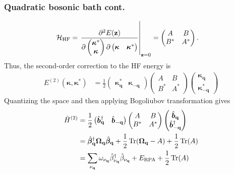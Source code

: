 \begin{frame}
    \frametitle{Quadratic bosonic bath cont.}
\begin{align}
    \mathcal H_{\rm HF}
    =
    \left.
    \frac{\partial^2 E(\mathbf z)}
    {\partial
    \begin{pmatrix}
        \boldsymbol{\kappa}^{*}\\
        \boldsymbol{\kappa}
    \end{pmatrix}
    \partial
    \begin{pmatrix}
        \boldsymbol{\kappa}&
        \boldsymbol{\kappa}^{*}
    \end{pmatrix}}
    \right|_{\mathbf z=0}
    &={
    \begin{pmatrix}
        A & B\\
        B^{*} & A^{*}
    \end{pmatrix}.
    }
\end{align} \pause
Thus, the second-order correction to the HF energy is
\begin{align}
E^{(2)}(\mathbf \kappa, \mathbf \kappa^{*})
    &=
    \frac{1}{2}
    \begin{pmatrix}
        \boldsymbol{\kappa}_{\mathbf q}^{*} &
        \boldsymbol{\kappa}_{-\mathbf q}
    \end{pmatrix}
    \begin{pmatrix}
        A & B\\
        B^{*} & A^{*}
    \end{pmatrix}
    \begin{pmatrix}
        \boldsymbol{\kappa}_{\mathbf q}\\
        \boldsymbol{\kappa}_{-\mathbf q}^{*}
    \end{pmatrix}
\end{align}\pause
Quantizing the space and then applying Bogoliubov transformation gives 
\begin{align}
    \hat{H}^{(2)}&= \frac{1}{2}
    \begin{pmatrix}
        \hat{\bm{b}}_{\mathbf q}^{\dagger} &
        \hat{\bm{b}}_{-\mathbf q}
    \end{pmatrix}
    \begin{pmatrix}
        A & B\\
        B^{*} & A^{*}
    \end{pmatrix}
    \begin{pmatrix}
        \hat{\bm{b}}_{\mathbf q}\\
        \hat{\bm{b}}_{-\mathbf q}^{\dagger}
    \end{pmatrix}\\
    &=
    \hat{\bm{\beta}}_{\mathbf q}^{\dagger} \boldsymbol{\Omega}_{\mathbf q} \hat{\bm{\beta}}_{\mathbf q}
    +
    \frac{1}{2}\operatorname{Tr}(\boldsymbol{\Omega}_{\mathbf q}-A)+\frac{1}{2}\operatorname{Tr}(A)\\
&= \sum_{\nu_{\mathbf q}} \omega_{\nu_{\mathbf q}} \hat{\beta}_{\nu_{\mathbf q}}^{\dagger} \hat{\beta}_{\nu_{\mathbf q}} + E_{\rm RPA} + \frac{1}{2}\operatorname{Tr}(A)
\end{align}
\end{frame}
